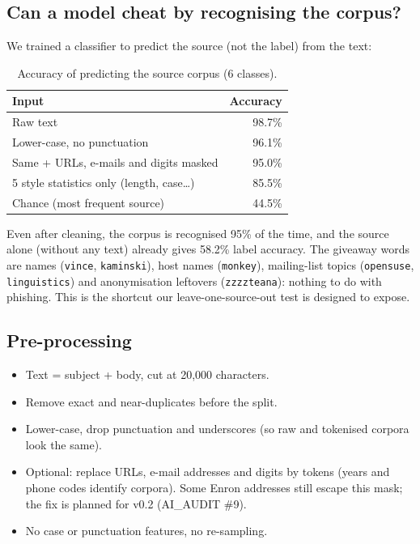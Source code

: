 \documentclass[11pt,a4paper]{article}
\begin{document}
\subsection{Can a model cheat by recognising the corpus?}
We trained a classifier to predict the source (not the label) from the text:
\begin{table}[H]\centering\small
\caption{Accuracy of predicting the source corpus (6 classes).}
\begin{tabular}{lr}
\toprule
Input & Accuracy \\
\midrule
Raw text & 98.7\% \\
Lower-case, no punctuation & 96.1\% \\
Same + URLs, e-mails and digits masked & 95.0\% \\
5 style statistics only (length, case\ldots) & 85.5\% \\
Chance (most frequent source) & 44.5\% \\
\bottomrule
\end{tabular}
\end{table}
Even after cleaning, the corpus is recognised 95\% of the time, and the source alone (without any text) already gives 58.2\% label accuracy. The giveaway words are names (\texttt{vince}, \texttt{kaminski}), host names (\texttt{monkey}), mailing-list topics (\texttt{opensuse}, \texttt{linguistics}) and anonymisation leftovers (\texttt{zzzzteana}): nothing to do with phishing. This is the shortcut our leave-one-source-out test is designed to expose.

\subsection{Pre-processing}
\begin{itemize}
\item Text = subject + body, cut at 20,000 characters.
\item Remove exact and near-duplicates before the split.
\item Lower-case, drop punctuation and underscores (so raw and tokenised corpora look the same).
\item Optional: replace URLs, e-mail addresses and digits by tokens (years and phone codes identify corpora). Some Enron addresses still escape this mask; the fix is planned for v0.2 (AI\_AUDIT \#9).
\item No case or punctuation features, no re-sampling.
\end{itemize}

\end{document}
